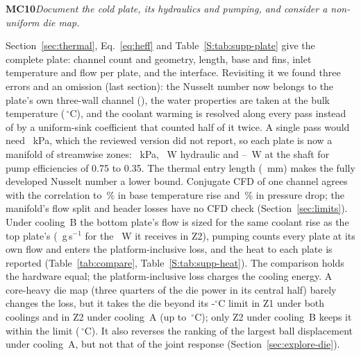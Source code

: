 \documentclass[10pt]{article}
\newcommand{\rc}[2]{\par\medskip\noindent\textbf{#1}\enspace\emph{#2}\par\smallskip\noindent}
\newcommand{\degC}{\,$^\circ$C}
\begin{document}
\rc{MC10}{Document the cold plate, its hydraulics and pumping, and consider a non-uniform die map.}
Section~\ref{sec:thermal}, Eq.~\eqref{eq:heff} and Table~\ref{S:tab:supp-plate} give the complete
plate: channel count and geometry, length, base and fins, inlet temperature and flow per plate, and
the interface. Revisiting it we found three errors and an omission (last section): the Nusselt
number now belongs to the plate's own three-wall channel (\CoolNu), the water properties are taken at
the bulk temperature (\MthTbulk\degC), and the coolant warming is resolved along every pass instead
of by a uniform-sink coefficient that counted half of it twice. A single pass would need
\CoolDpSinglePass~kPa, which the reviewed version did not report, so each plate is now a manifold of
\CoolZonesWord{} streamwise zones: \CoolDp~kPa,
\CoolPhyd~W hydraulic and \CoolPshaftLo--\CoolPshaftHi~W at the shaft for pump efficiencies of 0.75 to
0.35. The thermal entry length (\CoolLth~mm) makes the fully developed Nusselt number a lower bound.
Conjugate CFD of one channel agrees with the correlation to \MthCfdErr\,\% in base temperature rise and
\MthCfdDpErr\,\% in pressure drop; the manifold's flow split and header losses have no CFD check
(Section~\ref{sec:limits}). Under cooling~B the bottom plate's flow is sized for the same coolant rise
as the top plate's (\MthBotFlowZtwo~g\,s$^{-1}$ for the \MthBotQZtwo~W it receives in Z2), pumping
counts every plate at its own flow and enters the platform-inclusive loss, and the heat to each plate
is reported (Table~\ref{tab:compare}, Table~\ref{S:tab:supp-heat}). The comparison holds the hardware
equal; the platform-inclusive loss charges the cooling energy. A core-heavy die map (three quarters
of the die power in its central half) barely changes the loss, but it takes the die beyond its
\MthLimDie-$^\circ$C limit in Z1 under both coolings and in Z2 under cooling~A (up to
\FrDieHotMax\degC); only Z2 under cooling~B keeps it within the limit (\WrHotBZtwoDie\degC). It also
reverses the ranking of the largest ball displacement under cooling~A, but not that of the joint
response (Section~\ref{sec:explore-die}).
\end{document}
